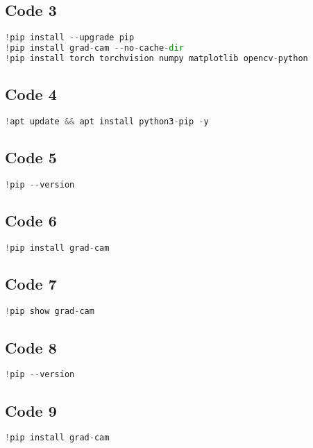 \documentclass{article}
\begin{document}
\subsection*{Code 3}
\begin{lstlisting}[language=Python]
!pip install --upgrade pip
!pip install grad-cam --no-cache-dir
!pip install torch torchvision numpy matplotlib opencv-python
\end{lstlisting}

\subsection*{Code 4}
\begin{lstlisting}[language=Python]
!apt update && apt install python3-pip -y
\end{lstlisting}

\subsection*{Code 5}
\begin{lstlisting}[language=Python]
!pip --version
\end{lstlisting}

\subsection*{Code 6}
\begin{lstlisting}[language=Python]
!pip install grad-cam

\end{lstlisting}

\subsection*{Code 7}
\begin{lstlisting}[language=Python]
!pip show grad-cam

\end{lstlisting}

\subsection*{Code 8}
\begin{lstlisting}[language=Python]
!pip --version

\end{lstlisting}

\subsection*{Code 9}
\begin{lstlisting}[language=Python]
!pip install grad-cam

\end{lstlisting}
\end{document}
